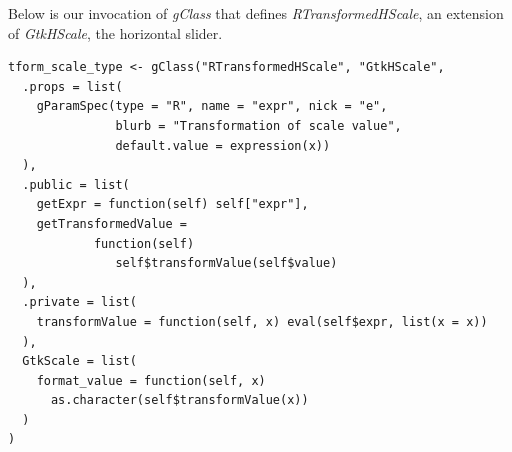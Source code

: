 \documentclass[article]{jss}
\begin{document}
Below is our invocation of \emph{gClass} that
defines \emph{RTransformedHScale}, an extension of \emph{GtkHScale},
the horizontal slider.
% 
%
\begin{verbatim}
tform_scale_type <- gClass("RTransformedHScale", "GtkHScale",
  .props = list(
    gParamSpec(type = "R", name = "expr", nick = "e", 
               blurb = "Transformation of scale value",                 
               default.value = expression(x))
  ),
  .public = list(
    getExpr = function(self) self["expr"],
    getTransformedValue = 
            function(self)
               self$transformValue(self$value)
  ),
  .private = list(
    transformValue = function(self, x) eval(self$expr, list(x = x))
  ),
  GtkScale = list(
    format_value = function(self, x)
      as.character(self$transformValue(x))
  )
)
\end{verbatim}
\end{document}
